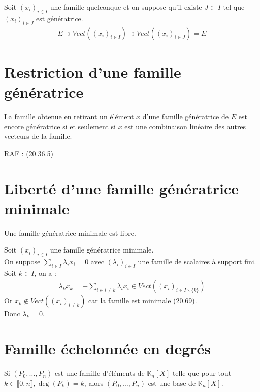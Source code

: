 \documentclass[../main.tex]{subfiles}
\begin{document}
\noindent Soit $(x_i)_{i\in I}$ une famille quelconque et on suppose qu'il existe $J \subset I$ tel que $(x_i)_{i\in J}$ est génératrice. \\
\begin{align*}
    E \supset Vect((x_i)_{i\in I}) \supset Vect((x_i)_{i\in J}) = E
\end{align*}

\section{Restriction d'une famille génératrice}
\begin{tcolorbox}[title=Propostion 20.69, title filled=false, colframe=lightblue, colback=lightblue!10!white]
    La famille obtenue en retirant un élément $x$ d'une famille génératrice de $E$ est encore génératrice si et seulement si $x$ est une combinaison linéaire des autres vecteurs de la famille. 
\end{tcolorbox}

\noindent RAF : (20.36.5)

\section{Liberté d'une famille génératrice minimale}
\begin{tcolorbox}[title=Propostion 20.71, title filled=false, colframe=lightblue, colback=lightblue!10!white]
    Une famille génératrice minimale est libre. 
\end{tcolorbox}

\noindent Soit $(x_i)_{i\in I}$ une famille génératrice minimale. \\
On suppose $\sum\limits_{i\in I} \lambda_i x_i = 0$ avec $(\lambda_i)_{i\in I}$ une famille de scalaires à support fini. \\
Soit $k\in I$, on a : 
\begin{align*}
    \lambda_k x_k = -\sum_{i\in i \neq k} \lambda_i x_i \in Vect((x_i)_{i\in I \backslash \{k\}})
\end{align*}
Or $x_k \not \in Vect((x_i)_{i \neq k})$ car la famille est minimale (20.69). \\
Donc $\lambda_k = 0$. 

\section{Famille échelonnée en degrés}
\begin{tcolorbox}[title=Propostion 20.78, title filled=false, colframe=lightblue, colback=lightblue!10!white]
    Si $(P_0, \ldots, P_n)$ est une famille d'éléments de $\mathbb{K}_n[X]$ telle que pour tout $k \in \llbracket 0, n \rrbracket, \deg (P_k) = k$, alors $(P_0, \ldots, P_n)$ est une base de $\mathbb{K}_n[X]$.
\end{tcolorbox}
\end{document}

